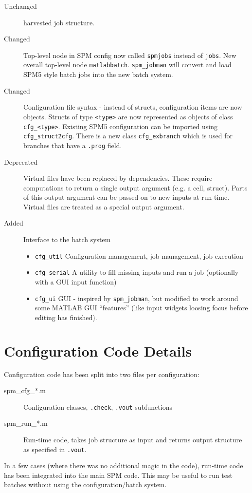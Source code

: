 \begin{description}
\item[Unchanged] harvested job structure.
\item[Changed] Top-level node in SPM config now called \verb|spmjobs| instead
  of \verb|jobs|. New overall top-level node
  \verb|matlabbatch|. \verb|spm_jobman| will convert and load SPM5 style batch
  jobs into the new batch system.
\item[Changed] Configuration file syntax - instead of structs, configuration
  items are now objects. Structs of type \verb|<type>| are now represented as
  objects of class \verb|cfg_<type>|. Existing SPM5 configuration can
  be imported using \verb|cfg_struct2cfg|. There is a new class
  \verb|cfg_exbranch| which is used for branches that have a \verb|.prog|
  field.
\item[Deprecated] Virtual files have been replaced by dependencies. These
  require computations to return a single output argument (e.g. a cell,
  struct). Parts of this output argument can be passed on to new inputs at
  run-time. Virtual files are treated as a special output argument.
\item[Added] Interface to the batch system
  \begin{itemize}
  \item \verb|cfg_util| Configuration management, job management, job
    execution
  \item \verb|cfg_serial| A utility to fill missing inputs and run a job
    (optionally with a GUI input function)
  \item \verb|cfg_ui| GUI - inspired by \verb|spm_jobman|, but modified to
    work around some MATLAB GUI ``features'' (like input widgets loosing focus
    before editing has finished).
  \end{itemize}

\end{description}

\section{Configuration Code Details}
\label{sec:code}

Configuration code has been split into two files per configuration:
\begin{description}
\item[spm\_cfg\_*.m] Configuration classes, \verb|.check|, \verb|.vout|
  subfunctions
\item[spm\_run\_*.m] Run-time code, takes job structure as input and returns
  output structure as specified in \verb|.vout|.
\end{description}
In a few cases (where there was no additional magic in the code), run-time
code has been integrated into the main SPM code. This may be useful to run
test batches without using the configuration/batch system.

